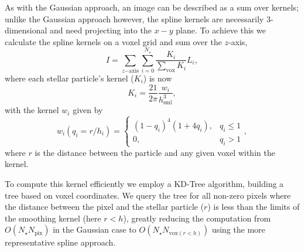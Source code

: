 As with the Gaussian approach, an image can be described as a sum over kernels; unlike the Gaussian approach however, the spline kernels are necessarily 3-dimensional and need projecting into the $x-y$ plane. To achieve this we calculate the spline kernels on a voxel grid and sum over the $z$-axis,  
\begin{equation}
I =  \sum_{z\mathrm{-axis}}\sum_{i=0}^{N_{\star}} \frac{K_i}{\sum_{\mathrm{vox}} K_i}L_i,
\end{equation}
where each stellar particle's kernel ($K_i$) is now
\begin{equation}
K_i =  \frac{21}{2\pi} \frac{w_i}{h_{\mathrm{sml}}^3},
\end{equation}
with the kernel $w_i$ given by
\begin{equation}
        w_i(q_i=r/h_i) = 
\begin{cases}
    \left(1-q_i\right)^{4}\left(1+4q_i\right), & q_i \leq 1\\
    0,              & q_i > 1
\end{cases},
\end{equation}
where $r$ is the distance between the particle and any given voxel within the kernel. 

To compute this kernel efficiently we employ a KD-Tree algorithm, building a tree based on voxel coordinates. We query the tree for all non-zero pixels where the distance between the pixel and the stellar particle ($r$) is less than the limits of the smoothing kernel (here $r<h$), greatly reducing the computation from $O(N_\star N_{\mathrm{pix}})$ in the Gaussian case to $O(N_\star N_{\mathrm{vox}(r<h)})$ using the more representative spline approach.


